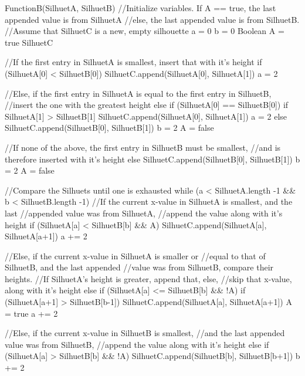 \documentclass[a4paper,oneside,article,11pt]{memoir}
\begin{document}
\begin{VerbatimTest}
FunctionB(SilhuetA, SilhuetB)
    //Initialize variables. If A == true, the last appended value is from SilhuetA 
    //else, the last appended value is from SilhuetB.
    //Assume that SilhuetC is a new, empty silhouette
    a = 0
    b = 0
    Boolean A = true
    SilhuetC

    //If the first entry in SilhuetA is smallest, insert that with it's height
    if (SilhuetA[0] < SilhuetB[0])
        SilhuetC.append(SilhuetA[0], SilhuetA[1])
        a = 2

    //Else, if the first entry in SilhuetA is equal to the first entry in SilhuetB,
    //insert the one with the greatest height
    else if (SilhuetA[0] == SilhuetB[0])
        if SilhuetA[1] > SilhuetB[1]
            SilhuetC.append(SilhuetA[0], SilhuetA[1])
            a = 2
        else
            SilhuetC.append(SilhuetB[0], SilhuetB[1])
            b = 2
            A = false

    //If none of the above, the first entry in SilhuetB must be smallest, 
    //and is therefore inserted with it's height
    else
        SilhuetC.append(SilhuetB[0], SilhuetB[1])
        b = 2
        A = false

    //Compare the Silhuets until one is exhausted
    while (a < SilhuetA.length -1 && b < SilhuetB.length -1)
        //If the current x-value in SilhuetA is smallest, and the last 
        //appended value was from SilhuetA, 
        //append the value along with it's height
        if (SilhuetA[a] < SilhuetB[b] && A)
            SilhuetC.append(SilhuetA[a], SilhuetA[a+1])
            a += 2


        //Else, if the current x-value in SilhuetA is smaller or 
        //equal to that of SilhuetB, and the last appended 
        //value was from SilhuetB, compare their heights. 
        //If SilhuetA's height is greater, append that, else,
        //skip that x-value, along with it's height
        else if (SilhuetA[a] <= SilhuetB[b] && !A)
            if (SilhuetA[a+1] > SilhuetB[b-1])
                SilhuetC.append(SilhuetA[a], SilhuetA[a+1])
                A = true
            a += 2

        //Else, if the current x-value in SilhuetB is smallest, 
        //and the last appended value was from SilhuetB, 
        //append the value along with it's height
        else if (SilhuetA[a] > SilhuetB[b] && !A)
            SilhuetC.append(SilhuetB[b], SilhuetB[b+1])
            b += 2


\end{VerbatimTest}
\end{document}
